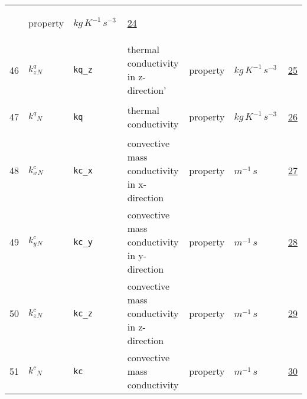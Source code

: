 \begin{longtable}{|p{1cm}|p{2.5cm}|p{4.5cm}|p{8cm}|p{3.0cm}|p{3cm}|p{1cm}|}
             & \begin{lay}property \end{lay}
             & $ kg \,K^{-1} \,s^{-3} \, $
             & \hyperlink{"e:24"}{ 24 }
                 \\
    46
             & \hypertarget{"v:46"}{ $ {{k^q_z}}{_{N}} $}
             & \verb|kq_z|
             & thermal conductivity in z-direction'
             & \begin{lay}property \end{lay}
             & $ kg \,K^{-1} \,s^{-3} \, $
             & \hyperlink{"e:25"}{ 25 }
                 \\
    47
             & \hypertarget{"v:47"}{ $ {{k^q}}{_{N}} $}
             & \verb|kq|
             & thermal conductivity
             & \begin{lay}property \end{lay}
             & $ kg \,K^{-1} \,s^{-3} \, $
             & \hyperlink{"e:26"}{ 26 }
                 \\
    48
             & \hypertarget{"v:48"}{ $ {{k^c_x}}{_{N}} $}
             & \verb|kc_x|
             & convective mass conductivity in x-direction
             & \begin{lay}property \end{lay}
             & $ m^{-1} \,s \, $
             & \hyperlink{"e:27"}{ 27 }
                 \\
    49
             & \hypertarget{"v:49"}{ $ {{k^c_y}}{_{N}} $}
             & \verb|kc_y|
             & convective mass conductivity in y-direction
             & \begin{lay}property \end{lay}
             & $ m^{-1} \,s \, $
             & \hyperlink{"e:28"}{ 28 }
                 \\
    50
             & \hypertarget{"v:50"}{ $ {{k^c_z}}{_{N}} $}
             & \verb|kc_z|
             & convective mass conductivity in z-direction
             & \begin{lay}property \end{lay}
             & $ m^{-1} \,s \, $
             & \hyperlink{"e:29"}{ 29 }
                 \\
    51
             & \hypertarget{"v:51"}{ $ {{k^c}}{_{N}} $}
             & \verb|kc|
             & convective mass conductivity
             & \begin{lay}property \end{lay}
             & $ m^{-1} \,s \, $
             & \hyperlink{"e:30"}{ 30 }

\end{longtable}
